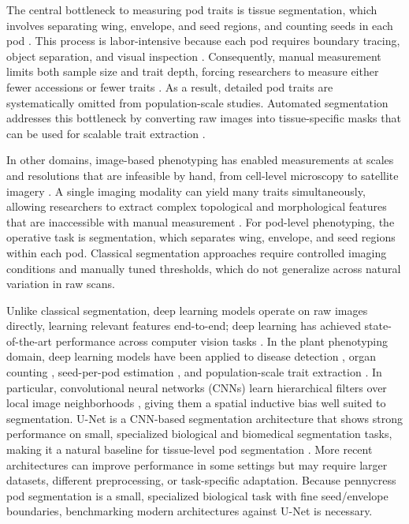 The central bottleneck to measuring pod traits is tissue segmentation, which involves separating wing, envelope, and seed regions, and counting seeds in each pod \cite{seed-cnn}. This process is labor-intensive because each pod requires boundary tracing, object separation, and visual inspection \cite{li2014review}. Consequently, manual measurement limits both sample size and trait depth, forcing researchers to measure either fewer accessions or fewer traits \cite{seed-cnn}. As a result, detailed pod traits are systematically omitted from population-scale studies. Automated segmentation addresses this bottleneck by converting raw images into tissue-specific masks that can be used for scalable trait extraction \cite{li2014review, lagergren2023fewshot}.

In other domains, image-based phenotyping has enabled measurements at scales and resolutions that are infeasible by hand, from cell-level microscopy to satellite imagery \cite{li2014review,lagergren2023fewshot}. A single imaging modality can yield many traits simultaneously, allowing researchers to extract complex topological and morphological features that are inaccessible with manual measurement \cite{li2014review}. For pod-level phenotyping, the operative task is segmentation, which separates wing, envelope, and seed regions within each pod. Classical segmentation approaches require controlled imaging conditions and manually tuned thresholds, which do not generalize across natural variation in raw scans.

Unlike classical segmentation, deep learning models operate on raw images directly, learning relevant features end-to-end; deep learning has achieved state-of-the-art performance across computer vision tasks \cite{krizhevsky2012imagenet, he2016deep}. In the plant phenotyping domain, deep learning models have been applied to disease detection \cite{mohanty2016plantdisease}, organ counting \cite{ubbens2018leafcounting}, seed-per-pod estimation \cite{seed-cnn}, and population-scale trait extraction \cite{wang2019high,lagergren2023fewshot}. In particular, convolutional neural networks (CNNs) learn hierarchical filters over local image neighborhoods \cite{lecun2015deep}, giving them a spatial inductive bias well suited to segmentation. U-Net is a CNN-based segmentation architecture that shows strong performance on small, specialized biological and biomedical segmentation tasks, making it a natural baseline for tissue-level pod segmentation \cite{unet}. More recent architectures can improve performance in some settings but may require larger datasets, different preprocessing, or task-specific adaptation. Because pennycress pod segmentation is a small, specialized biological task with fine seed/envelope boundaries, benchmarking modern architectures against U-Net is necessary.

